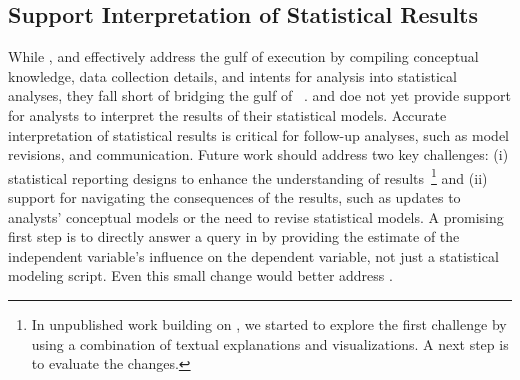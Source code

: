 \subsection{Support Interpretation of Statistical Results}
While \tea, \tisane and \rTisane effectively address the gulf of execution by
compiling conceptual knowledge, data collection details, and intents for
analysis into statistical analyses, they fall short of bridging the gulf of
~\cite{norman2013doet}. \tisane and \rTisane doe not yet provide support for analysts to
interpret the results of their statistical models. Accurate interpretation of
statistical results is critical for follow-up analyses, such as model revisions,
and communication. Future work should address two key challenges: (i)
statistical reporting designs to enhance the understanding of
results~\footnote{In unpublished work building on \tea, we started to explore
the first challenge by using a combination of textual explanations and
visualizations. A next step is to evaluate the changes.} and (ii) support for
navigating the consequences of the results, such as updates to analysts'
conceptual models or the need to revise statistical models. A promising first
step is to directly answer a query in \rTisane by providing the estimate of the
independent variable's influence on the dependent variable, not just a
statistical modeling script. Even this small change would better address
\thesisChallengeUnderstanding. 

\begin{comment}
Tisane's focus is on authoring GLMs/GLMMs, but accurate interpretation is also necessary. For instance, analysts may need
help interpreting what their statistical models and results mean in relation to
their input conceptual models. Do the results suggest their conceptual model is
correct? What kind of inferences should they make? Future work should address
these interpretation challenges, which may require eliciting hypotheses and expected results from analysts.

Although researchers in our pilot or case studies did not presume
Tisane helped with formal causal analysis, the ability to express causal
relationships (\texttt{causes}) may lead some analysts to erroneously assume
that their models assess causality. Changing the name of the language construct
and/or building out support to interpret GLM/GLMM results may resolve this concern. One way to support accurate interpretation and reporting could be to
output a figure representing the input conceptual model along with visual
summaries of the data and/or statistical model for direct inclusion in publications. 
Tisane could also allow analysts to annotate their disambiguation decisions with
their own rationale and provide a richer log of selections than currently
supported. Tisane could even accept these augmented logs to save the state of the GUI in between analysis sessions.
\end{comment}


